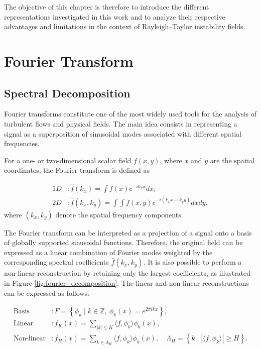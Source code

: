 The objective of this chapter is therefore to introduce the different representations investigated in this work and to analyze their respective advantages and limitations in the context of Rayleigh--Taylor instability fields.

\section{Fourier Transform}

\subsection{Spectral Decomposition}

Fourier transforms constitute one of the most widely used tools for the analysis of turbulent flows and physical fields. The main idea consists in representing a signal as a superposition of sinusoidal modes associated with different spatial frequencies.

For a one- or two-dimensional scalar field $f(x,y)$, where $x$ and $y$ are the spatial coordinates, the Fourier transform is defined as


\begin{align}
    1D&: \hat{f}(k_x) = \int f(x) e^{-i k_x x} dx, \\
    2D&: \hat{f}(k_x,k_y) = \int\int f(x,y) e^{-i(k_x x + k_y y)} dx dy,  
\end{align}
where $(k_x,k_y)$ denote the spatial frequency components.

The Fourier transform can be interpreted as a projection of a signal onto a basis of globally supported sinusoidal functions. Therefore, the original field can be expressed as a linear combination of Fourier modes weighted by the corresponding spectral coefficients $\hat{f}(k_x,k_y)$. It is also possible to perform a non-linear reconstruction by retaining only the largest coefficients, as illustrated in Figure \ref{fig:fourier_decomposition}. The linear and non-linear reconstructions can be expressed as follows:

\begin{align}
    \text{Basis} &: F = \left\{ \phi_k \mid k\in\mathbb{Z},\ \phi_k(x) = e^{2\pi i k x} \right\}, \\
    \text{Linear} &: f_K(x)=\sum_{ |k| \le K }\langle f, \phi_k \rangle \phi_k(x), \\
    \text{Non-linear} &: f_H(x)=\sum_{ k \in \Lambda_H } \langle f,\phi_k \rangle \phi_k(x),
    \quad \Lambda_H=\left\{ k \mid |\langle f, \phi_k \rangle| \ge H \right\}.
\end{align}


